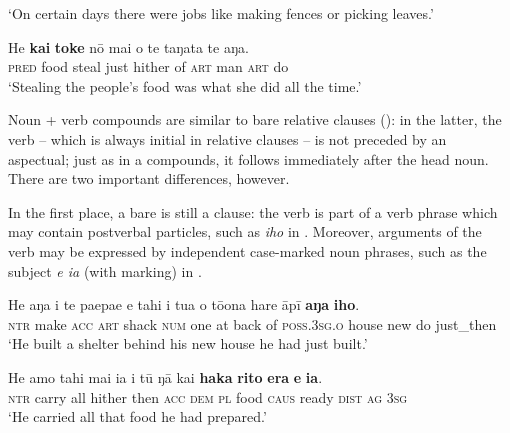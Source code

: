 \glt 
‘On certain days there were jobs like making fences or picking leaves.’ \textstyleExampleref{[R380.084]} 
\z

\ea\label{ex:5.129}
\gll He \textbf{kai} \textbf{toke} nō mai o te taŋata te aŋa. \\
\textsc{pred} food steal just hither of \textsc{art} man \textsc{art} do \\

\glt
‘Stealing the people’s food was what she did all the time.’{\rmfnm} \textstyleExampleref{[R368.017]}  
\z
{}

Noun + verb compounds are similar to bare relative clauses (): in the latter, the verb – which is always initial in relative clauses – is not preceded by an aspectual; just as in a compounds, it follows immediately after the head noun. There are two important differences, however. 

In the first place, a bare  is still a clause: the verb is part of a verb phrase which may contain postverbal particles, such as \textit{iho} in . Moreover, arguments of the verb may be expressed by independent case-marked noun phrases, such as the subject \textit{e ia} (with  marking) in . 

\ea\label{ex:5.130}
\gll He aŋa i te paepae e tahi {\ꞌ}i tu{\ꞌ}a o tō{\ꞌ}ona hare {\ꞌ}āpī \textbf{aŋa} \textbf{iho}.\\
\textsc{ntr} make \textsc{acc} \textsc{art} shack \textsc{num} one at back of \textsc{poss.3sg.o} house new do just\_then\\

\glt 
‘He built a shelter behind his new house he had just built.’ \textstyleExampleref{[R250.131]} 
\z

\ea\label{ex:5.131}
\gll He {\ꞌ}amo tahi mai ia i tū ŋā kai \textbf{haka} \textbf{rito} \textbf{era} \textbf{e} \textbf{ia}.\\
\textsc{ntr} carry all hither then \textsc{acc} \textsc{dem} \textsc{pl} food \textsc{caus} ready \textsc{dist} \textsc{ag} \textsc{3sg}\\

\glt
‘He carried all that food he had prepared.’ \textstyleExampleref{[R304.078]} 
\z

